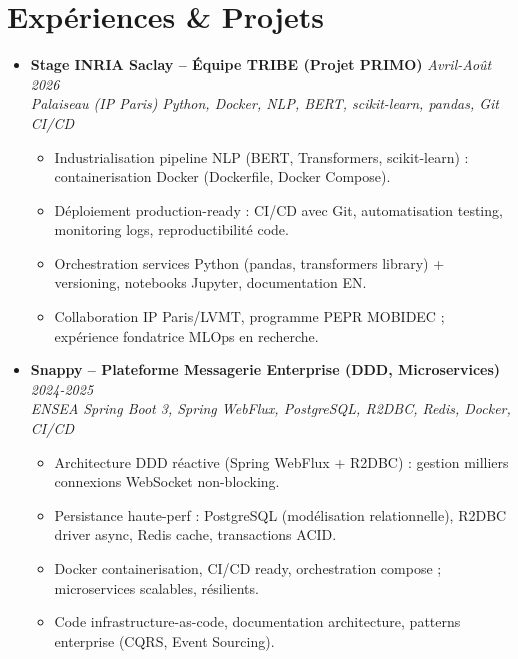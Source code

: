 \documentclass[a4paper,11pt]{article}
\begin{document}
\section{Exp\'eriences \& Projets}
\begin{itemize}[leftmargin=*, label=\tiny$\bullet$, nosep]
    \item \textbf{Stage INRIA Saclay -- \'Equipe TRIBE (Projet PRIMO)} \hfill \textit{Avril-Ao\^ut 2026} \\
    \textit{Palaiseau (IP Paris)} \hfill \textit{Python, Docker, NLP, BERT, scikit-learn, pandas, Git CI/CD}
    \vspace{-2pt}
    \begin{itemize}[leftmargin=0.4cm, nosep, label=\tiny$\bullet$]
        \item \small{Industrialisation pipeline NLP (BERT, Transformers, scikit-learn) : containerisation Docker (Dockerfile, Docker Compose).}
        \item \small{D\'eploiement production-ready : CI/CD avec Git, automatisation testing, monitoring logs, reproductibilit\'e code.}
        \item \small{Orchestration services Python (pandas, transformers library) + versioning, notebooks Jupyter, documentation EN.}
        \item \small{Collaboration IP Paris/LVMT, programme PEPR MOBIDEC ; exp\'erience fondatrice MLOps en recherche.}
    \end{itemize}
    \vspace{3pt}

    \item \textbf{Snappy -- Plateforme Messagerie Enterprise (DDD, Microservices)} \hfill \textit{2024-2025} \\
    \textit{ENSEA} \hfill \textit{Spring Boot 3, Spring WebFlux, PostgreSQL, R2DBC, Redis, Docker, CI/CD}
    \vspace{-2pt}
    \begin{itemize}[leftmargin=0.4cm, nosep, label=\tiny$\bullet$]
        \item \small{Architecture DDD r\'eactive (Spring WebFlux + R2DBC) : gestion milliers connexions WebSocket non-blocking.}
        \item \small{Persistance haute-perf : PostgreSQL (mod\'elisation relationnelle), R2DBC driver async, Redis cache, transactions ACID.}
        \item \small{Docker containerisation, CI/CD ready, orchestration compose ; microservices scalables, r\'esilients.}
        \item \small{Code infrastructure-as-code, documentation architecture, patterns enterprise (CQRS, Event Sourcing).}
    \end{itemize}
    \vspace{3pt}


\end{itemize}
\end{document}
